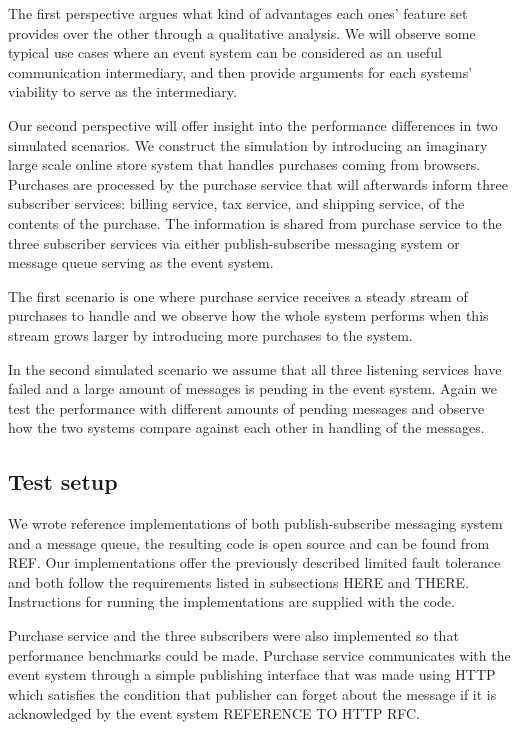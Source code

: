 \documentclass[conference]{IEEEtran}
\begin{document}
The first perspective argues what kind of advantages each ones' feature set provides over the other through a qualitative analysis. We will observe some typical use cases where an event system can be considered as an useful communication intermediary, and then provide arguments for each systems' viability to serve as the intermediary.

Our second perspective will offer insight into the performance differences in two simulated scenarios. We construct the simulation by introducing an imaginary large scale online store system that handles purchases coming from browsers. Purchases are processed by the purchase service that will afterwards inform three subscriber services: billing service, tax service, and shipping service, of the contents of the purchase. The information is shared from purchase service to the three subscriber services via either publish-subscribe messaging system or message queue serving as the event system.

The first scenario is one where purchase service receives a steady stream of purchases to handle and we observe how the whole system performs when this stream grows larger by introducing more purchases to the system.

In the second simulated scenario we assume that all three listening services have failed and a large amount of messages is pending in the event system. Again we test the performance with different amounts of pending messages and observe how the two systems compare against each other in handling of the messages.

\subsection{Test setup}
We wrote reference implementations of both publish-subscribe messaging system and a message queue, the resulting code is open source and can be found from REF. Our implementations offer the previously described limited fault tolerance and both follow the requirements listed in subsections HERE and THERE. Instructions for running the implementations are supplied with the code.

Purchase service and the three subscribers were also implemented so that performance benchmarks could be made. Purchase service communicates with the event system through a simple publishing interface that was made using HTTP which satisfies the condition that publisher can forget about the message if it is acknowledged by the event system REFERENCE TO HTTP RFC.
\end{document}
